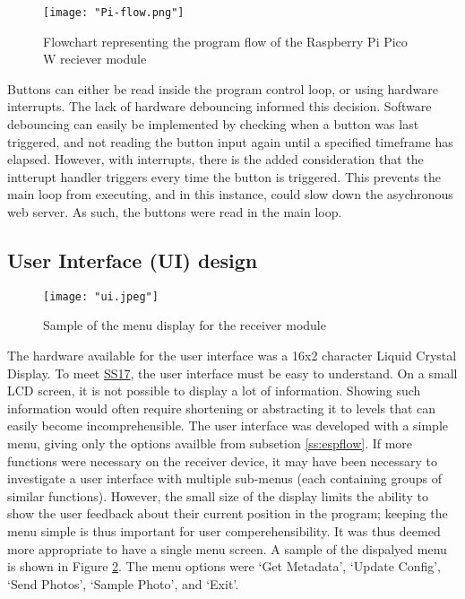 \documentclass[class=report,11pt,crop=false]{standalone}
\begin{document}
\begin{figure}[ht]
    \centering
    \texttt{[image: "Pi-flow.png"]}
    \caption{Flowchart representing the program flow of the Raspberry Pi Pico W reciever module}
    \label{fig:piflow}
\end{figure}

Buttons can either be read inside the program control loop, or using hardware interrupts. The lack of hardware debouncing informed this decision. Software debouncing can easily be implemented by checking when a button was last triggered, and not reading the button input again until a specified timeframe has elapsed. However, with interrupts, there is the added consideration that the intterupt handler triggers every time the button is triggered. This prevents the main loop from executing, and in this instance, could slow down the asychronous web server. As such, the buttons were read in the main loop. 

\subsection{User Interface (UI) design}
\begin{figure}[ht]
    \centering
    \texttt{[image: "ui.jpeg"]}
    \caption{Sample of the menu display for the receiver module}
    \label{fig:uisample}
\end{figure}

The hardware available for the user interface was a 16x2 character Liquid Crystal Display. To meet \hyperlink{tab:firmware-requirements}{SS17}, the user interface must be easy to understand. On a small LCD screen, it is not possible to display a lot of information. Showing such information would often require shortening or abstracting it to levels that can easily become incomprehensible.  The user interface was developed with a simple menu, giving only the options availble from subsetion \ref{ss:espflow}. If more functions were necessary on the receiver device, it may have been necessary to investigate a user interface with multiple sub-menus (each containing groups of similar functions). However, the small size of the display limits the ability to show the user feedback about their current position in the program; keeping the menu simple is thus important for user comperehensibility. It was thus deemed more appropriate to have a single menu screen. A sample of the dispalyed menu is shown in Figure \ref{fig:uisample}. The menu options were `Get Metadata', `Update Config', `Send Photos', `Sample Photo', and `Exit'. 
\end{document}
